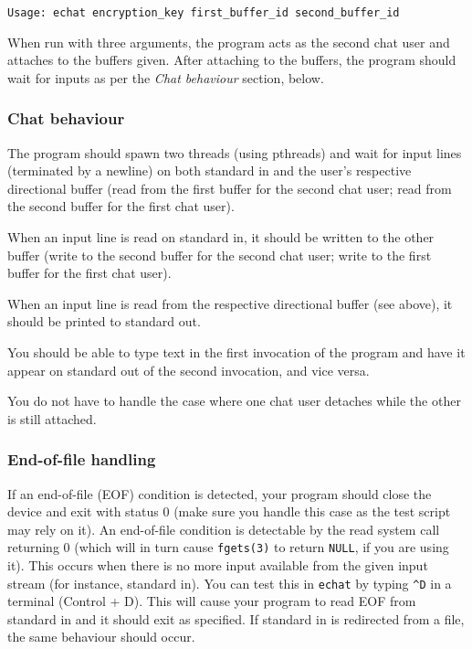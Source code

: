 \documentclass[12pt,a4paper]{article}
\begin{document}
\texttt{Usage: echat encryption\_key first\_buffer\_id second\_buffer\_id}

When run with three arguments, the program acts as the second chat user and
attaches to the buffers given. After attaching to the buffers, the program
should wait for inputs as per the \textit{Chat behaviour} section, below.

\subsubsection*{Chat behaviour}

The program should spawn two threads (using pthreads) and wait for input lines
(terminated by a newline) on both standard in and the user's respective
directional buffer (read from the first buffer for the second chat user; read
from the second buffer for the first chat user).

When an input line is read on standard in, it should be written to the other
buffer (write to the second buffer for the second chat user; write to the first
buffer for the first chat user).

When an input line is read from the respective directional buffer (see above),
it should be printed to standard out.

You should be able to type text in the first invocation of the program and
have it appear on standard out of the second invocation, and vice versa.

You do not have to handle the case where one chat user detaches while the other
is still attached.

\subsubsection*{End-of-file handling}

If an end-of-file (EOF) condition is detected, your program should close the
device and exit with status 0 (make sure you handle this case as the test
script may rely on it). An end-of-file condition is detectable by the read
system call returning 0 (which will in turn cause \texttt{fgets(3)} to return
\texttt{NULL}, if you are using it). This occurs when there is no more input
available from the given input stream (for instance, standard in). You can test
this in \texttt{echat} by typing \verb|^D| in a terminal (Control + D). This
will cause your program to read EOF from standard in and it should exit as
specified. If standard in is redirected from a file, the same behaviour should
occur.
\end{document}
